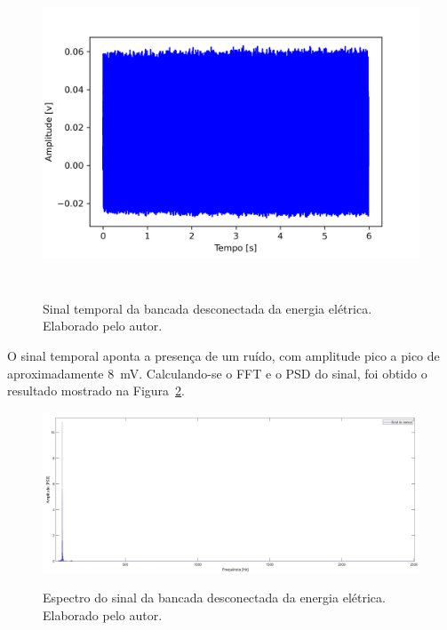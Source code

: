 \documentclass[
	12pt,				
	oneside,			
	a4paper,			
	english,			
	brazil,			
	]{abntex2ppgsi}
\begin{document}
\begin{figure}[H]
\centering
\caption {Sinal temporal da bancada desconectada da energia elétrica. Elaborado pelo autor.}
\includegraphics[width=\textwidth,height=90mm,keepaspectratio]{Caso0/maquina_desligada_da_tomada}
\label{maquina_desligada_da_tomada}
\end{figure} 

O sinal temporal aponta a presença de um ruído, com amplitude pico a pico de aproximadamente {\SI{8}{\milli\volt}}. Calculando-se o FFT e o PSD do sinal, foi obtido o resultado mostrado na Figura~\ref{PSD_SENSOR_MAQUINA_DESLIGADA}. 

\begin{figure}[H]
\centering
\caption {Espectro do sinal da bancada desconectada da energia elétrica. Elaborado pelo autor.}
\includegraphics[width=170mm,keepaspectratio]{Caso0/PSD_SENSOR_MAQUINA_DESLIGADA}
\label{PSD_SENSOR_MAQUINA_DESLIGADA}
\end{figure} 
\end{document}
